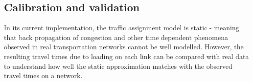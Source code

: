 \subsection{Calibration and validation}
In its current implementation, the traffic assignment model is static - meaning that back propagation of congestion and other time dependent phenomena observed in real transportation networks cannot be well modelled. However, the resulting travel times due to loading on each link can be compared with real data to understand how well the static approximation matches with the observed travel times on a network. 

